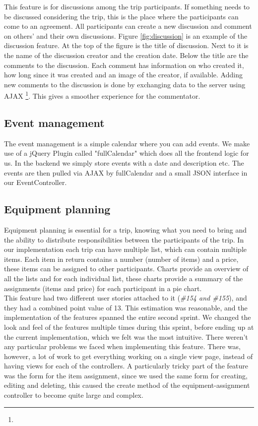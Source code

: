 \documentclass[a4paper]{article}
\begin{document}
This feature is for discussions among the trip participants. If something needs to be discussed considering the trip, this is the place where the participants can come to an agreement. All participants can create a new discussion and comment on others' and their own discussions. Figure \ref{fig:discussion} is an example of the discussion feature. At the top of the figure is the title of discussion. Next to it is the name of the discussion creator and the creation date. Below the title are the comments to the discussion. Each comment has information on who created it, how long since it was created and an image of the creator, if available. Adding new comments to the discussion is done by exchanging data to the server using AJAX \footnote{\AJAX}. This gives a smoother experience for the commentator. 

\subsection{Event management}
The event management is a simple calendar where you can add events. We make use of a jQuery Plugin called "fullCalendar" which does all the frontend logic for us. In the backend we simply store events with a date and description etc. The events are then pulled via AJAX by fullCalendar and a small JSON interface in our EventController.

\subsection{Equipment planning}
Equipment planning is essential for a trip, knowing what you need to bring and the ability to distribute responsibilities between the participants of the trip. In our implementation each trip can have multiple list, which can contain multiple items. Each item in return contains a number (number of items) and a price, these items can be assigned to other participants. Charts provide an overview of all the lists and for each individual list, these charts provide a summary of the assignments (items and price) for each participant in a pie chart. \\ This feature had two different user stories attached to it (\emph{\#154 and \#155}), and they had a combined point value of 13. This estimation was reasonable, and the implementation of the features spanned the entire second sprint. We changed the look and feel of the features multiple times during this sprint, before ending up at the current implementation, which we felt was the most intuitive. There weren't any particular problems we faced when implementing this feature. There was, however, a lot of work to get everything working on a single view page, instead of having views for each of the controllers. A particularly tricky part of the feature was the form for the item assignment, since we used the same form for creating, editing and deleting, this caused the create method of the equipment-assignment controller to become quite large and complex. 
\end{document}
